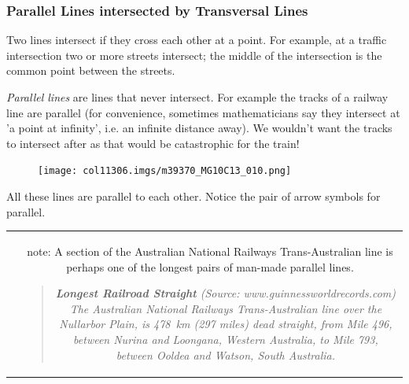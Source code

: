             \subsubsection{ Parallel Lines intersected by Transversal Lines}
            \nopagebreak
            \label{m39370*id316211}Two lines intersect if they cross each other at a point. For example, at a traffic intersection two or more streets intersect; the middle of the intersection is the common point between the streets.\par 
        \label{m39370*id316216}\textsl{Parallel lines} are lines that never intersect. For example the tracks of a railway line are parallel (for convenience, sometimes mathematicians say they intersect at 'a point at infinity', i.e. an infinite distance away). We wouldn't want the tracks to intersect after as that would be catastrophic for the train!\par 
        \label{m39370*id316225}
    \setcounter{subfigure}{0}
	\begin{figure}[H] %
    \begin{center}
    \label{m39370*id316228!!!underscore!!!media}\label{m39370*id316228!!!underscore!!!printimage}\texttt{[image: col11306.imgs/m39370\_MG10C13\_010.png]} %
      \vspace{2pt}
    \vspace{.1in}
    \end{center}
 \end{figure}       
        \par 
        \label{m39370*id316235}All these lines are parallel to each other. Notice the pair of arrow symbols for parallel.\par 
\label{m39370*notfhsst!!!underscore!!!id438}
\begin{tabular}{cc}
	\hspace*{-50pt}\raisebox{-8 mm}{\hspace{-0.2in}\texttt{[image: col11306.imgs/psfact2.png]} } & 
	\begin{minipage}{0.85\textwidth}
	\begin{note}
      {note: }
        \label{m39370*id316245}A section of the Australian National Railways Trans-Australian line is perhaps one of the longest pairs of man-made parallel lines.\par 
        \label{m39370*id316258}
          \label{m39370*id316258!!!underscore!!!quote}\begin{quote}{\sl \textbf{Longest Railroad Straight} (Source: www.guinnessworldrecords.com)
The Australian National Railways Trans-Australian line over the Nullarbor Plain, is 478~km (297 miles) dead straight, from Mile 496, between Nurina and Loongana, Western Australia, to Mile 793, between Ooldea and Watson, South Australia.} %
    \end{quote}
        \par 
	\end{note}
	\end{minipage}
	\end{tabular}
